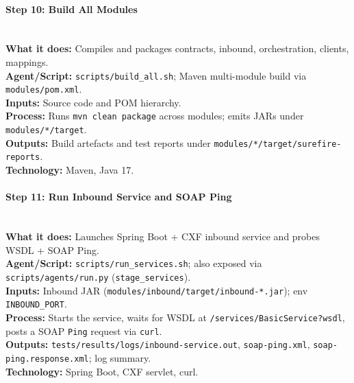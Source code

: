 \documentclass[11pt,a4paper]{article}
\begin{document}
\paragraph{Step 10: Build All Modules} \hfill\\
\textbf{What it does:} Compiles and packages contracts, inbound, orchestration, clients, mappings.\\
\textbf{Agent/Script:} \texttt{scripts/build\_all.sh}; Maven multi-module build via \texttt{modules/pom.xml}.\\
\textbf{Inputs:} Source code and POM hierarchy.\\
\textbf{Process:} Runs \texttt{mvn clean package} across modules; emits JARs under \texttt{modules/*/target}.\\
\textbf{Outputs:} Build artefacts and test reports under \texttt{modules/*/target/surefire-reports}.\\
\textbf{Technology:} Maven, Java 17.

\paragraph{Step 11: Run Inbound Service and SOAP Ping} \hfill\\
\textbf{What it does:} Launches Spring Boot + CXF inbound service and probes WSDL + SOAP Ping.\\
\textbf{Agent/Script:} \texttt{scripts/run\_services.sh}; also exposed via \texttt{scripts/agents/run.py} (\texttt{stage\_services}).\\
\textbf{Inputs:} Inbound JAR (\texttt{modules/inbound/target/inbound-*.jar}); env \texttt{INBOUND\_PORT}.\\
\textbf{Process:} Starts the service, waits for WSDL at \texttt{/services/BasicService?wsdl}, posts a SOAP \texttt{Ping} request via \texttt{curl}.\\
\textbf{Outputs:} \texttt{tests/results/logs/inbound-service.out}, \texttt{soap-ping.xml}, \texttt{soap-ping.response.xml}; log summary.\\
\textbf{Technology:} Spring Boot, CXF servlet, curl.
\end{document}
